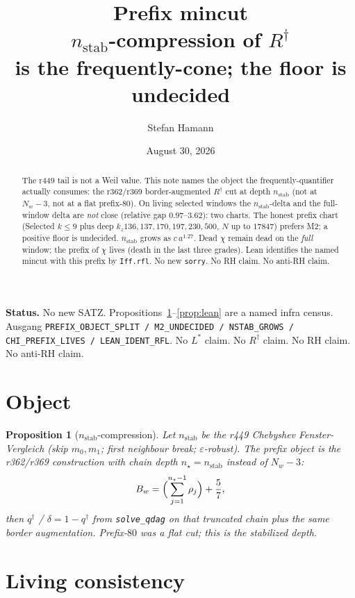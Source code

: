 \documentclass[11pt]{article}
\title{\bfseries Prefix mincut\\[2mm]
\large $n_{\mathrm{stab}}$-compression of $R^{\dagger}$\\
is the frequently-cone; the floor is undecided}
\author{Stefan Hamann}
\date{August 30, 2026}
\newtheorem{prop}{Proposition}
\begin{document}
\maketitle

\begin{abstract}\noindent
The r449 tail is not a Weil value.
This note names the object the frequently-quantifier
actually consumes: the r362/r369 border-augmented
$R^{\dagger}$ cut at depth $n_{\mathrm{stab}}$
(not at $N_w-3$, not at a flat prefix-$80$).
On living selected windows the $n_{\mathrm{stab}}$-delta
and the full-window delta are \emph{not} close
(relative gap $0.97$--$3.62$): two charts.
The honest prefix chart (Selected $k\le 9$ plus
deep $k_z136,137,170,197,230,500$, $N$ up to $17847$)
prefers M2; a positive floor is undecided.
$n_{\mathrm{stab}}$ grows as $c\,a^{1.27}$.
Dead $\chi$ remain dead on the \emph{full} window;
the prefix of $\chi$ lives (death in the last three
grades).  Lean identifies the named mincut with this
prefix by \texttt{Iff.rfl}.  No new \texttt{sorry}.
No RH claim.  No anti-RH claim.
\end{abstract}

\medskip\noindent
\textbf{Status.}\enspace
No new SATZ.
Propositions~\ref{prop:object}--\ref{prop:lean}
are a named infra census.
Ausgang
\texttt{PREFIX\_OBJECT\_SPLIT / M2\_UNDECIDED / NSTAB\_GROWS / CHI\_PREFIX\_LIVES / LEAN\_IDENT\_RFL}.
No $L^{*}$ claim.  No $R^{\dagger}$ claim.
No RH claim.  No anti-RH claim.

\section{Object}\label{sec:object}

\begin{prop}[$n_{\mathrm{stab}}$-compression]\label{prop:object}
Let $n_{\mathrm{stab}}$ be the r449 Chebyshev
Fenster-Vergleich (skip $m_0,m_1$; first neighbour
break; $\varepsilon$-robust).
The prefix object is the r362/r369 construction
with chain depth $n_{\star}=n_{\mathrm{stab}}$
instead of $N_w-3$:
\[
B_w=\Bigl(\sum_{j=1}^{n_{\star}-1}\rho_j\Bigr)+\frac57,
\]
then $q^{\dagger}$ / $\delta=1-q^{\dagger}$ from
\texttt{solve\_qdag} on that truncated chain plus
the same border augmentation.
Prefix-$80$ was a flat cut; this is the
stabilized depth.
\end{prop}

\section{Living consistency}\label{sec:cons}
\end{document}
